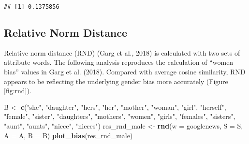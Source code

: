 \documentclass[english,man,mask]{apa6}
\newenvironment{Shaded}{\begin{snugshade}}{\end{snugshade}}
\newcommand{\DataTypeTok}[1]{\textcolor[rgb]{0.13,0.29,0.53}{#1}}
\newcommand{\KeywordTok}[1]{\textcolor[rgb]{0.13,0.29,0.53}{\textbf{#1}}}
\newcommand{\NormalTok}[1]{#1}
\newcommand{\StringTok}[1]{\textcolor[rgb]{0.31,0.60,0.02}{#1}}
\begin{document}
\begin{verbatim}
## [1] 0.1375856
\end{verbatim}

\hypertarget{relative-norm-distance}{%
\subsection{Relative Norm Distance}\label{relative-norm-distance}}

Relative norm distance (RND) (Garg et al., 2018) is calculated with two sets of attribute words. The following analysis reproduces the calculation of \enquote{women bias} values in Garg et al. (2018). Compared with average cosine similarity, RND appears to be reflecting the underlying gender bias more accurately (Figure \ref{fig:rnd}).

\begin{Shaded}
\begin{Highlighting}[]
\NormalTok{B <-}\StringTok{ }\KeywordTok{c}\NormalTok{(}\StringTok{"she"}\NormalTok{, }\StringTok{"daughter"}\NormalTok{, }\StringTok{"hers"}\NormalTok{, }\StringTok{"her"}\NormalTok{, }\StringTok{"mother"}\NormalTok{, }\StringTok{"woman"}\NormalTok{, }\StringTok{"girl"}\NormalTok{,}
       \StringTok{"herself"}\NormalTok{, }\StringTok{"female"}\NormalTok{, }\StringTok{"sister"}\NormalTok{, }\StringTok{"daughters"}\NormalTok{, }\StringTok{"mothers"}\NormalTok{, }\StringTok{"women"}\NormalTok{,}
       \StringTok{"girls"}\NormalTok{, }\StringTok{"females"}\NormalTok{, }\StringTok{"sisters"}\NormalTok{, }\StringTok{"aunt"}\NormalTok{, }\StringTok{"aunts"}\NormalTok{, }\StringTok{"niece"}\NormalTok{, }\StringTok{"nieces"}\NormalTok{)}
\NormalTok{res_rnd_male <-}\StringTok{ }\KeywordTok{rnd}\NormalTok{(}\DataTypeTok{w =}\NormalTok{ googlenews, }\DataTypeTok{S =}\NormalTok{ S, }\DataTypeTok{A =}\NormalTok{ A, }\DataTypeTok{B =}\NormalTok{ B)}
\KeywordTok{plot_bias}\NormalTok{(res_rnd_male)}
\end{Highlighting}
\end{Shaded}
\end{document}
